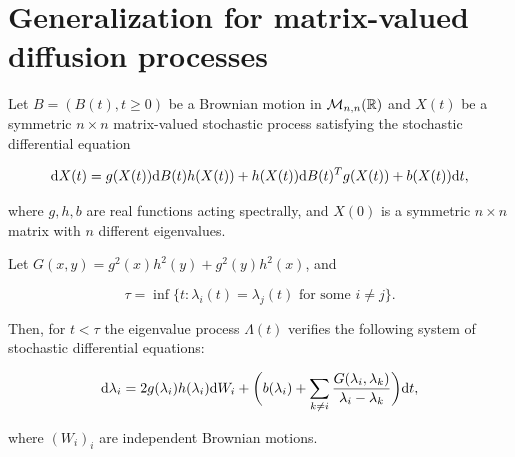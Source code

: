 \section{Generalization for matrix-valued diffusion processes} \label{sec:matrix_difusions}

\begin{theorem} \label{thm:diffusion_real}
    Let $B = (B(t), t\ge 0)$ be a Brownian motion in $\mathcal M_{n,n}(\mathbb R)$ and $X(t)$ be a symmetric $n\times n$ matrix-valued stochastic process satisfying the stochastic differential equation

    \begin{equation}
        \mathrm d X(t) = g(X(t)) \mathrm d B(t) h(X(t)) + h(X(t)) \mathrm d B(t)^T g(X(t)) + b(X(t))\mathrm d t, \label{eq:matrix_diffusion}
    \end{equation}

    where $g,h,b$ are real functions acting spectrally, and $X(0)$ is a symmetric $n\times n$ matrix with $n$ different eigenvalues. 

    Let $G(x,y) = g^2(x)h^2(y) + g^2(y)h^2(x)$, and
    
    \begin{equation}
        \tau = \inf\{ t: \lambda_i(t) = \lambda_j(t) \text{ for some } i\neq j \}. \label{eq:collision_time}
    \end{equation} 
    
    Then, for $t < \tau$ the eigenvalue process $\Lambda(t)$ verifies the following system of stochastic differential equations:

    \begin{equation}
        \mathrm d \lambda_i = 2g(\lambda_i)h(\lambda_i)\mathrm d W_i + \biggl( b(\lambda_i) + \sum_{k\neq i} \frac{G(\lambda_i,\lambda_k)}{\lambda_i - \lambda_k} \biggr)\mathrm d t, \label{eq:gen_dyson}
    \end{equation}

    \noindent where $(W_i)_{i}$ are independent Brownian motions.
\end{theorem}

